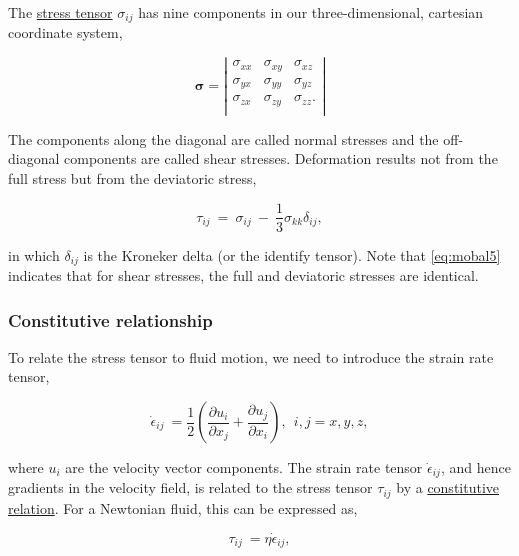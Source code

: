 The \href{http://en.wikipedia.org/wiki/Stress_tensor}{stress tensor} $\sigma_{ij}$ has nine components in our three-dimensional,
cartesian coordinate system,

\begin{equation}
\mathbf{\sigma} =
\left\vert  \begin{array}{ccc} 
    \sigma _{ xx} & \sigma _{ xy} & \sigma _{ xz} \\
    \sigma _{ yx} & \sigma _{ yy} & \sigma _{ yz} \\
    \sigma _{ zx} & \sigma _{ zy} & \sigma _{ zz}. \\
\end{array} \right\vert 
\label{eq:mobal4}
\end{equation}

The components along the diagonal are called normal stresses and the off-diagonal components are called shear stresses. Deformation results
not from the full stress but from the deviatoric stress,

\begin{equation}
\tau_{ ij} ~ = ~ \sigma _{ ij} ~ - ~{\frac{ 1}{ 3}} \sigma _{ kk} \delta _{ ij},
\label{eq:mobal5}
\end{equation}

in which $\delta_{ ij}$ is the Kroneker delta (or the identify tensor). Note that \eqref{eq:mobal5} indicates that for shear stresses, the full
and deviatoric stresses are identical.

\subsubsection{Constitutive relationship}

To relate the stress tensor to fluid motion, we need to introduce the strain rate tensor,

\begin{equation}
\dot{\epsilon}_{ij}~= \frac{1}{2}\left( \frac{ \partial u_{i}}{\partial x_{j}} + \frac{ \partial u_{j}}{\partial x_{i}}\right), ~~i,j = x,y,z,
\label{eq:mobal6}
\end{equation}

where $u_i$ are the velocity vector components. The strain rate tensor $\dot{\epsilon}_{ij}$, and hence gradients in the 
velocity field, is related to the stress tensor $\tau_{ij}$ by a \href{http://en.wikipedia.org/wiki/Constitutive_equation}
{constitutive relation}. For a Newtonian fluid, this can be expressed as,

\begin{equation}
\tau_{ij}~=\eta \dot{\epsilon}_{ij},
\label{eq:mobal7}
\end{equation}

